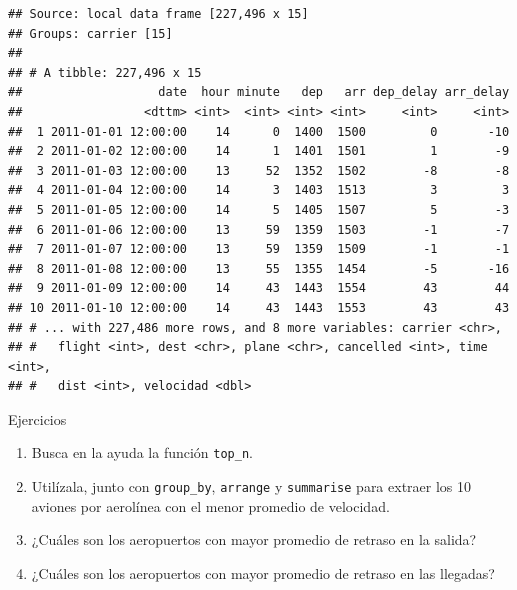 \documentclass[]{article}
\begin{document}
\begin{verbatim}
## Source: local data frame [227,496 x 15]
## Groups: carrier [15]
## 
## # A tibble: 227,496 x 15
##                   date  hour minute   dep   arr dep_delay arr_delay
##                 <dttm> <int>  <int> <int> <int>     <int>     <int>
##  1 2011-01-01 12:00:00    14      0  1400  1500         0       -10
##  2 2011-01-02 12:00:00    14      1  1401  1501         1        -9
##  3 2011-01-03 12:00:00    13     52  1352  1502        -8        -8
##  4 2011-01-04 12:00:00    14      3  1403  1513         3         3
##  5 2011-01-05 12:00:00    14      5  1405  1507         5        -3
##  6 2011-01-06 12:00:00    13     59  1359  1503        -1        -7
##  7 2011-01-07 12:00:00    13     59  1359  1509        -1        -1
##  8 2011-01-08 12:00:00    13     55  1355  1454        -5       -16
##  9 2011-01-09 12:00:00    14     43  1443  1554        43        44
## 10 2011-01-10 12:00:00    14     43  1443  1553        43        43
## # ... with 227,486 more rows, and 8 more variables: carrier <chr>,
## #   flight <int>, dest <chr>, plane <chr>, cancelled <int>, time <int>,
## #   dist <int>, velocidad <dbl>
\end{verbatim}

\renewcommand\bcStyleTitre[1]{\large\textcolor{bbblack}{#1}}

\begin{bclogo}[
  couleur=llred,
  arrondi=0,
  logo=\bcstop,
  barre=none,
  noborder=true]{Ejercicios}
\begin{enumerate}
\item Busca en la ayuda la función \texttt{top\_n}.
\item Utilízala, junto con \texttt{group\_by}, \texttt{arrange} y \texttt{summarise} para extraer los 10 
aviones por aerolínea con el menor promedio de velocidad.
\item ¿Cuáles son los aeropuertos con mayor promedio de retraso en la salida?
\item ¿Cuáles son los aeropuertos con mayor promedio de retraso en las llegadas?
\end{enumerate}

\end{bclogo}
\end{document}
